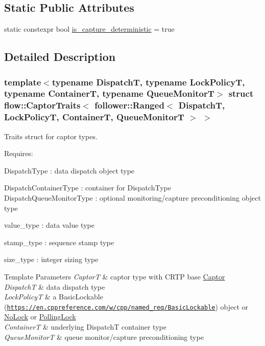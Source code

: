 \subsection*{Static Public Attributes}
\begin{DoxyCompactItemize}
\item 
static constexpr bool \hyperlink{structflow_1_1_captor_traits_3_01follower_1_1_ranged_3_01_dispatch_t_00_01_lock_policy_t_00_01_c08104af94995091b5ab7569e730f476c_aed220dcf982664420a545dc0638eb0fc}{is\+\_\+capture\+\_\+deterministic} = true
\end{DoxyCompactItemize}


\subsection{Detailed Description}
\subsubsection*{template$<$typename DispatchT, typename Lock\+PolicyT, typename ContainerT, typename Queue\+MonitorT$>$\newline
struct flow\+::\+Captor\+Traits$<$ follower\+::\+Ranged$<$ Dispatch\+T, Lock\+Policy\+T, Container\+T, Queue\+Monitor\+T $>$ $>$}

Traits struct for captor types. 

Requires\+:
\begin{DoxyItemize}
\item {\ttfamily Dispatch\+Type} \+: data dispatch object type
\item {\ttfamily Dispatch\+Container\+Type} \+: container for {\ttfamily Dispatch\+Type} {\ttfamily Dispatch\+Queue\+Monitor\+Type} \+: optional monitoring/capture preconditioning object type
\item {\ttfamily value\+\_\+type} \+: data value type
\item {\ttfamily stamp\+\_\+type} \+: sequence stamp type
\item {\ttfamily size\+\_\+type} \+: integer sizing type
\end{DoxyItemize}


\begin{DoxyTemplParams}{Template Parameters}
{\em CaptorT} & captor type with C\+R\+TP base {\ttfamily \hyperlink{classflow_1_1_captor}{Captor}}\\
\hline
{\em DispatchT} & data dispatch type \\
\hline
{\em Lock\+PolicyT} & a Basic\+Lockable (\href{https://en.cppreference.com/w/cpp/named_req/BasicLockable}{\tt https\+://en.\+cppreference.\+com/w/cpp/named\+\_\+req/\+Basic\+Lockable}) object or \hyperlink{structflow_1_1_no_lock}{No\+Lock} or \hyperlink{structflow_1_1_polling_lock}{Polling\+Lock} \\
\hline
{\em ContainerT} & underlying {\ttfamily DispatchT} container type \\
\hline
{\em Queue\+MonitorT} & queue monitor/capture preconditioning type \\
\hline
\end{DoxyTemplParams}


